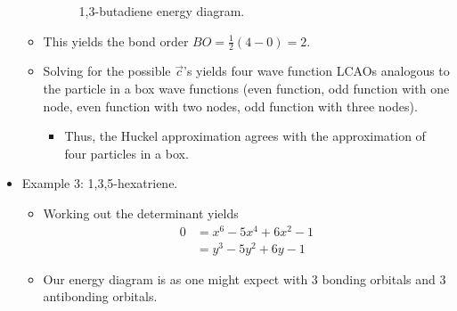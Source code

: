 \documentclass[../notes.tex]{subfiles}
\begin{document}
\begin{itemize}
\begin{itemize}
\begin{figure}[h!]
            \caption{1,3-butadiene energy diagram.}
            \label{fig:butadieneEN}
        \end{figure}
        \item This yields the bond order $BO=\frac{1}{2}(4-0)=2$.
        \item Solving for the possible $\vec{c}$'s yields four wave function LCAOs analogous to the particle in a box wave functions (even function, odd function with one node, even function with two nodes, odd function with three nodes).
        \begin{itemize}
            \item Thus, the Huckel approximation agrees with the approximation of four particles in a box.
        \end{itemize}
    \end{itemize}
    \item Example 3: 1,3,5-hexatriene.
    \begin{itemize}
        \item Working out the determinant yields
        \begin{align*}
            0 &= x^6-5x^4+6x^2-1\\
            &= y^3-5y^2+6y-1
        \end{align*}
        \item Our energy diagram is as one might expect with 3 bonding orbitals and 3 antibonding orbitals.
    \end{itemize}
\end{itemize}
\end{document}
